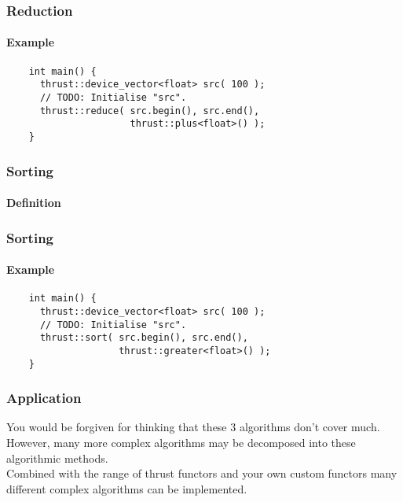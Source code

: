 \begin{frame}[fragile]
  \frametitle{Reduction}
  \framesubtitle{Example}
  \begin{example}
    \begin{lstlisting}
    int main() {
      thrust::device_vector<float> src( 100 );
      // TODO: Initialise "src".
      thrust::reduce( src.begin(), src.end(),
                      thrust::plus<float>() );
    }
    \end{lstlisting}
  \end{example}
\end{frame}

\begin{frame}[fragile]
  \frametitle{Sorting}
  \framesubtitle{Definition}
  \begin{center}
  \end{center}
\end{frame}

\begin{frame}[fragile]
  \frametitle{Sorting}
  \framesubtitle{Example}
  \begin{example}
    \begin{lstlisting}
    int main() {
      thrust::device_vector<float> src( 100 );
      // TODO: Initialise "src".
      thrust::sort( src.begin(), src.end(),
                    thrust::greater<float>() );
    }
    \end{lstlisting}
  \end{example}
\end{frame}

\begin{frame}
  \frametitle{Application}
  You would be forgiven for thinking that these 3 algorithms don't
  cover much. However, many more complex algorithms may be decomposed
  into these algorithmic methods. \\
  \vspace{.4cm}
  Combined with the range of thrust functors and your own custom functors
  many different complex algorithms can be implemented.
\end{frame}

